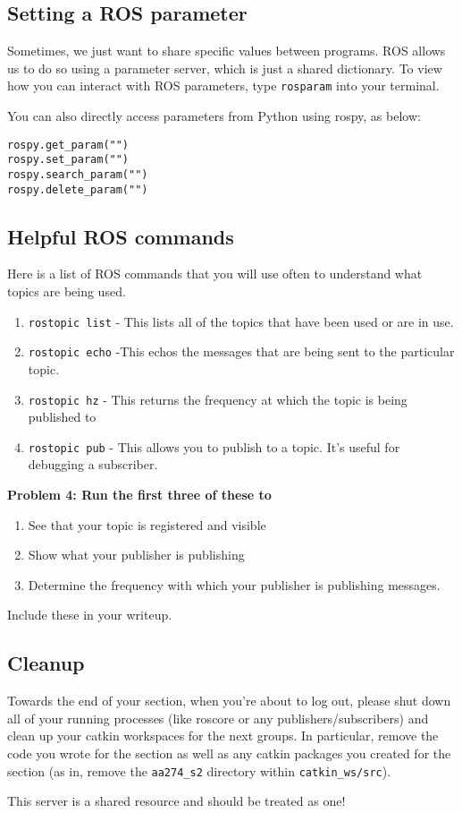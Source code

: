 
\subsection{Setting a ROS parameter}
Sometimes, we just want to share specific values between programs. ROS allows us to do so using a parameter server, which is just a shared dictionary. To view how you can interact with ROS parameters, type \texttt{rosparam} into your terminal.

You can also directly access parameters from Python using rospy, as below:

\begin{lstlisting}
rospy.get_param("")
rospy.set_param("")
rospy.search_param("")
rospy.delete_param("")
\end{lstlisting}

\subsection{Helpful ROS commands}
Here is a list of ROS commands that you will use often to understand what topics are being used.
\begin{enumerate}
	\item \texttt{rostopic list} - This lists all of the topics that have been used or are in use.
	\item \texttt{rostopic echo} -This echos the messages that are being sent to the particular topic.
	\item \texttt{rostopic hz} - This returns the frequency at which the topic is being published to
	\item \texttt{rostopic pub} - This allows you to publish to a topic. It's useful for debugging a subscriber.
\end{enumerate}

{\bf Problem 4: Run the first three of these to
\begin{enumerate}[label=(\alph*)]
    \item See that your topic is registered and visible
    \item Show what your publisher is publishing
    \item Determine the frequency with which your publisher is publishing messages.
\end{enumerate}
Include these in your writeup.}

\subsection{Cleanup}

Towards the end of your section, when you're about to log out, please shut down all of your running processes (like roscore or any publishers/subscribers) and clean up your catkin workspaces for the next groups. In particular, remove the code you wrote for the section as well as any catkin packages you created for the section (as in, remove the \texttt{aa274\_s2} directory within \texttt{catkin\_ws/src}). 

This server is a shared resource and should be treated as one!
